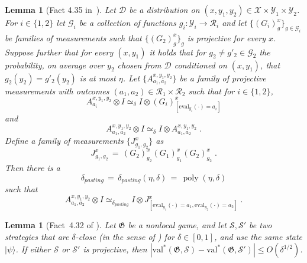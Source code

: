 \documentclass[11pt]{article}
\newtheorem{lemma}[theorem]{Lemma}
\theoremstyle{definition}
\newcommand{\ket}[1]{|#1\rangle}
\newcommand{\Id}{\ensuremath{I}}
\DeclareMathOperator{\poly}{poly}
\newcommand{\val}{\ensuremath{\mathrm{val}}}
\newcommand{\game}{\mathfrak{G}}
\newcommand{\strategy}{\mathscr{S}}
\newcommand{\eval}{\mathrm{eval}}
\begin{document}
\begin{lemma}[Fact 4.35 in~\cite{NW19}]\label{lem:pasting}
Let $\mathcal{D}$ be a distribution on $(x,y_1,y_2)\in \mathcal{X}\times \mathcal{Y}_1\times \mathcal{Y}_2$. For $i\in \{1,2\}$ let $\mathcal{G}_i$ be a collection of functions $g_i: \mathcal{Y}_i \to \mathcal{R}_i$ and let $\{(G_i)^{x}_{g}\}_{g\in \mathcal{G}_i}$ be families of measurements such that $\{(G_2)^x_g\}_g$ is projective for every $x$. Suppose further that for every $(x,y_1)$ it holds that for $g_2\neq g'_2 \in \mathcal{G}_2$ the probability, on average over $y_2$ chosen from $\mathcal{D}$ conditioned on $(x,y_1)$, that $g_2(y_2)=g'_2(y_2)$  is at most $\eta$. 
Let $\{A^{x,y_1,y_2}_{a_1,a_2}\}$ be a family of projective measurements with outcomes $(a_1,a_2)\in \mathcal{R}_1 \times \mathcal{R}_2$ such that for $i\in \{1,2\}$,
\begin{equation}\label{eq:pasting-1}
 A^{x,y_1,y_2}_{a_i} \otimes \Id \simeq_\delta \Id \otimes (G_i)^x_{[\eval_{y_i}(\cdot)=a_i]}
\end{equation}
and 
\begin{equation}\label{eq:pasting-2}
 A^{x,y_1,y_2}_{a_1,a_2} \otimes \Id \simeq_\delta \Id \otimes  A^{x,y_1,y_2}_{a_1,a_2}\;.
\end{equation}
Define a family of measurements $\{J^x_{g_1,g_2}\}$ as
\begin{equation}\label{eq:pasting-2a}
 J^x_{g_1,g_2} \,=\, (G_2)^x_{g_2} (G_1)^x_{g_1} (G_2)^x_{g_2}\;.
\end{equation}
Then there is a 
\begin{equation}\label{eq:def-deltap}
\delta_{pasting} \,=\, \delta_{pasting}(\eta,\delta)\,=\, \poly(\eta,\delta)
\end{equation} such that 
\begin{equation}\label{eq:pasting-3}
 A^{x,y_1,y_2}_{a_1,a_2} \otimes \Id \simeq_{\delta_{pasting}} \Id \otimes J^x_{[\eval_{y_1}(\cdot)=a_1,\eval_{y_2}(\cdot) = a_2]}\;.
\end{equation}
\end{lemma}





\begin{lemma}[Fact~4.32 of \cite{NW19}]
  \label{lem:close-strategies-have-close-values}
  Let $\game$ be a nonlocal game, and let $\strategy, \strategy'$ be
  two strategies that are $\delta$-close (in the sense of
  ) for $\delta \in [0,1]$, and use the
  same state $\ket{\psi}$. If either $\strategy$ or $\strategy'$ is
  projective, then $|\val^*(\game,\strategy) - \val^*(\game,
  \strategy')| \leq O(\delta^{1/2})$.
\end{lemma}
\end{document}
